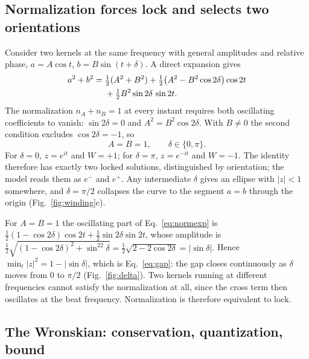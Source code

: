 \documentclass[%
 reprint, amsmath,amssymb, aps, prb, ]{revtex4-2}
\numberwithin{equation}{section}
\begin{document}
\subsection{Normalization forces lock and selects two orientations}

Consider two kernels at the same frequency with general amplitudes and relative phase, $a=A\cos t$, $b=B\sin(t+\delta)$. A direct expansion gives
\begin{align}
a^2+b^2={}&\tfrac12(A^2+B^2)+\tfrac12\big(A^2-B^2\cos2\delta\big)\cos2t
\notag\\
&+\tfrac12B^2\sin2\delta\,\sin2t .
\label{eq:normexp}
\end{align}
The normalization $n_A+n_B=1$ at every instant requires both oscillating coefficients to vanish: $\sin2\delta=0$ and $A^2=B^2\cos2\delta$. With $B\neq0$ the second condition excludes $\cos2\delta=-1$, so
\begin{equation}
A=B=1,\qquad \delta\in\{0,\pi\}.
\label{eq:twosol}
\end{equation}
For $\delta=0$, $z=e^{it}$ and $W=+1$; for $\delta=\pi$, $z=e^{-it}$ and $W=-1$. The identity therefore has exactly two locked solutions, distinguished by orientation; the model reads them as $e^{-}$ and $e^{+}$. Any intermediate $\delta$ gives an ellipse with $|z|<1$ somewhere, and $\delta=\pi/2$ collapses the curve to the segment $a=b$ through the origin (Fig.~\ref{fig:winding}c).

For $A=B=1$ the oscillating part of Eq.~\eqref{eq:normexp} is $\tfrac12(1-\cos2\delta)\cos2t+\tfrac12\sin2\delta\sin2t$, whose amplitude is $\tfrac12\sqrt{(1-\cos2\delta)^2+\sin^22\delta}=\tfrac12\sqrt{2-2\cos2\delta}=|\sin\delta|$. Hence $\min_t|z|^2=1-|\sin\delta|$, which is Eq.~\eqref{eq:gap}: the gap closes continuously as $\delta$ moves from $0$ to $\pi/2$ (Fig.~\ref{fig:delta}). Two kernels running at different frequencies cannot satisfy the normalization at all, since the cross term then oscillates at the beat frequency. Normalization is therefore equivalent to lock.

\subsection{The Wronskian: conservation, quantization, bound}
\end{document}
